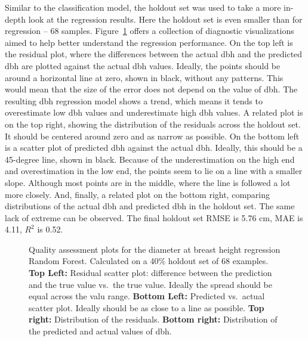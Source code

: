 Similar to the classification model, the holdout set was used to take a more in-depth look at the regression results.
Here the holdout set is even smaller than for regression – 68 samples.
Figure~\ref{fig-reg-residuals} offers a collection of diagnostic visualizations aimed to help better understand the regression performance.
On the top left is the residual plot, where the differences between the actual dbh and the predicted dbh are plotted against the actual dbh values.
Ideally, the points should be around a horizontal line at zero, shown in black, without any patterns.
This would mean that the size of the error does not depend on the value of dbh.
The resulting dbh regression model shows a trend, which means it tends to overestimate low dbh values and underestimate high dbh values.
A related plot is on the top right, showing the distribution of the residuals across the holdout set.
It should be centered around zero and as narrow as possible.
On the bottom left is a scatter plot of predicted dbh against the actual dbh.
Ideally, this should be a 45-degree line, shown in black.
Because of the underestimation on the high end and overestimation in the low end, the points seem to lie on a line with a smaller slope.
Although most points are in the middle, where the line is followed a lot more closely.
And, finally, a related plot on the bottom right, comparing distributions of the actual dbh and predicted dbh in the holdout set.
The same lack of extreme can be observed.
The final holdout set RMSE is 5.76 cm, MAE is 4.11, $R^2$ is 0.52.

\begin{figure}
\caption[Quality assessment plots for the dbh regression Random Forest.]{\label{fig-reg-residuals}Quality assessment plots for the
diameter at breast height regression Random Forest. Calculated on a 40\%
holdout set of 68 examples. \textbf{Top Left:} Residual scatter plot:
difference between the prediction and the true value vs.~the true value.
Ideally the spread should be equal across the valu range. \textbf{Bottom
Left:} Predicted vs.~actual scatter plot. Ideally should be as close to
a line as possible. \textbf{Top right:} Distribution of the residuals.
\textbf{Bottom right:} Distribution of the predicted and actual values
of dbh.}
\end{figure}

